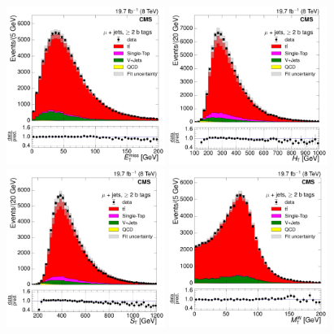 \begin{figure}[hbtp]
    \centering
     \includegraphics[width=0.46\textwidth]{Chapters/07_08_09_Analysis/Images/control_plots/after_fit/8TeV/MuPlusJets_patType1CorrectedPFMet_2orMoreBtags_with_ratio}\hfill
     \includegraphics[width=0.46\textwidth]{Chapters/07_08_09_Analysis/Images/control_plots/after_fit/8TeV/MuPlusJets_HT_2orMoreBtags_with_ratio}\\                            
     \includegraphics[width=0.46\textwidth]{Chapters/07_08_09_Analysis/Images/control_plots/after_fit/8TeV/MuPlusJets_patType1CorrectedPFMet_ST_2orMoreBtags_with_ratio}\hfill
     \includegraphics[width=0.46\textwidth]{Chapters/07_08_09_Analysis/Images/control_plots/after_fit/8TeV/MuPlusJets_patType1CorrectedPFMet_MT_2orMoreBtags_with_ratio}\\     

\end{figure}

